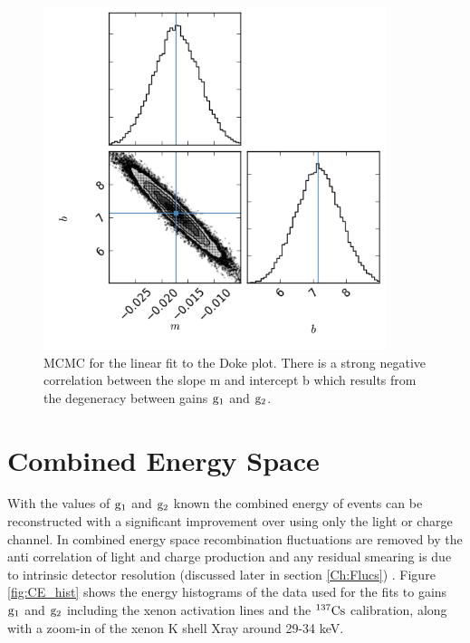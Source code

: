 \begin{figure}[h!]\centering
\includegraphics[width=100mm]{Chapter_E_Scale/Figures/MCMC/triangle.png} %
\caption{MCMC for the linear fit to the Doke plot. There is a strong negative correlation between the slope m and intercept b which results from the degeneracy between gains $\rm g_1$ and $\rm g_2$. }
\label{fig:MCMC} 
\end{figure}

\newpage

\section{Combined Energy Space}
\label{sec:E_specs}
With the values of $\rm g_1$ and $\rm g_2$ known the combined energy of events can be reconstructed with a significant improvement over using only the light or charge channel. In combined energy space recombination fluctuations are removed by the anti correlation of light and charge production and any residual smearing is due to intrinsic detector resolution (discussed later in section \ref{Ch:Flucs}) . Figure \ref{fig:CE_hist} shows the energy histograms of the data used for the fits to gains $\rm g_1$ and $\rm g_2$ including the xenon activation lines and the $\rm^{137}Cs$ calibration, along with a zoom-in of the xenon K shell Xray around 29-34 keV. 


